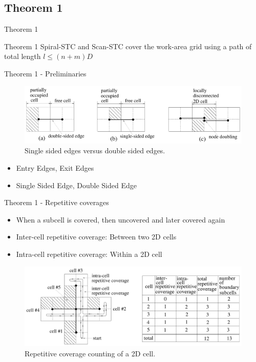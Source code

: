 \documentclass{beamer}
\begin{document}
\subsection{Theorem 1}
\begin{frame}{Theorem 1}
    \begin{block}{Theorem 1}
        Spiral-STC and Scan-STC cover the work-area grid using a path of total length $l \leq (n + m)D$
    \end{block}
\end{frame}
\begin{frame}{Theorem 1 - Preliminaries}
    \begin{figure}
        \includegraphics[width=\linewidth]{Images/inv_fig4.png}
        \caption{Single sided edges versus double sided edges.}
    \end{figure}
    \begin{itemize}
        \item Entry Edges, Exit Edges
        \item Single Sided Edge, Double Sided Edge
    \end{itemize}
\end{frame}

\begin{frame}{Theorem 1 - Repetitive coverages}
    \begin{itemize}
        \item When a subcell is covered, then uncovered and later covered again
        \item Inter-cell repetitive coverage: Between two 2D cells
        \item Intra-cell repetitive coverage: Within a 2D cell
    \end{itemize}
    \begin{figure}
        \includegraphics[width=\linewidth]{Images/inv_fig9.png}
        \caption{Repetitive coverage counting of a 2D cell.}
    \end{figure}
\end{frame}
\end{document}
